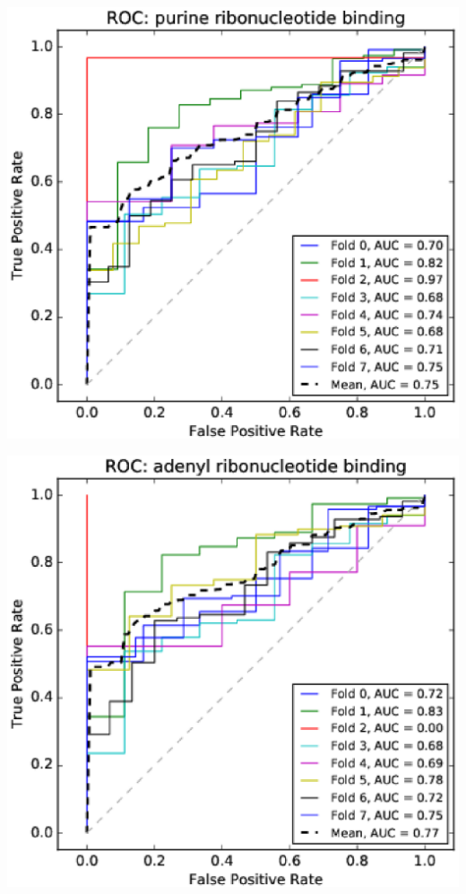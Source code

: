\documentclass[11pt,twoside,a4paper]{book}
\newenvironment{Figure}
  {\par\medskip\noindent\minipage{\linewidth}}
  {\endminipage\par\medskip}
\begin{document}
\begin{multicols}{2}
\begin{Figure}\begin{center}\includegraphics[width=\linewidth]{figures/roc_purine_ribonucleotide_binding}\label{fig:roc_purine_ribonucleotide_binding}\end{center}\end{Figure}
\begin{Figure}\begin{center}\includegraphics[width=\linewidth]{figures/roc_adenyl_ribonucleotide_binding}\label{fig:roc_adenyl_ribonucleotide_binding}\end{center}\end{Figure}
\end{multicols}
\end{document}
